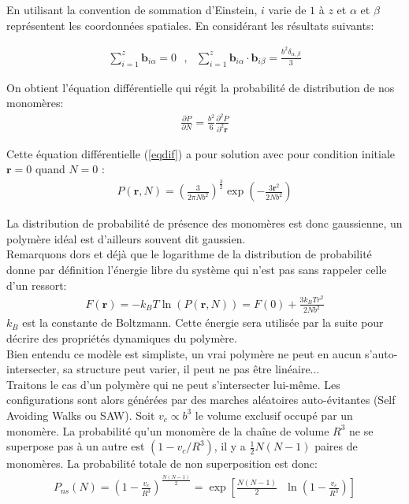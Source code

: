 \documentclass[a4paper,11pt]{article}
\begin{document}
En utilisant la convention de sommation d'Einstein, $i$ varie de $1$ à $z$ et $\alpha$ et $\beta$ représentent les coordonnées spatiales. En considérant les résultats suivants:

\begin{eqnarray}
\sum_{i=1}^{z}\textbf{b}_{i\alpha}=0 \text{ },\text{ } \sum_{i=1}^{z}\textbf{b}_{i\alpha}\cdot\textbf{b}_{i\beta} = \frac{b^2\delta_{\alpha,\beta}}{3}
\end{eqnarray}

On obtient l'équation différentielle qui régit la probabilité de distribution de nos monomères:
\begin{eqnarray}
 \frac{\partial P}{\partial N} =   \frac{b^2}{6}\frac{\partial ^2 P}{\partial ^2 \textbf{r}}
 \label{eqdif}
\end{eqnarray}

Cette équation différentielle (\ref{eqdif}) a pour solution avec pour condition initiale $\textbf{r}=0$ quand $N=0$ :
\begin{eqnarray}
P(\textbf{r},N)=\left(\frac{3}{2\pi N b^2}\right)^\frac{3}{2}\exp\left(-\frac{3\textbf{r}^2}{2 N b^2}\right)
\end{eqnarray}

La distribution de probabilité de présence des monomères est donc gaussienne, un polymère idéal est d'ailleurs souvent dit gaussien.\\

Remarquons dors et déjà que le logarithme de la distribution de probabilité donne par définition l'énergie libre du système qui n'est pas sans rappeler celle d'un ressort:
\begin{eqnarray}
F(\textbf{r})= - k_B T \ln(P(\textbf{r},N))= F(0)+\frac{3k_BTr^2}{2Nb^2}
\label{elibre}
\end{eqnarray}
$k_B$ est la constante de Boltzmann. Cette énergie sera utilisée par la suite pour décrire des propriétés dynamiques du polymère.\\



Bien entendu ce modèle est simpliste, un vrai polymère ne peut en aucun s'auto-intersecter, sa structure peut varier, il peut ne pas être linéaire...\\

 Traitons le cas d'un polymère qui ne peut s'intersecter lui-même. Les configurations sont alors générées par des marches aléatoires auto-évitantes (Self Avoiding Walks ou SAW). Soit $v_c \propto b^3$ le volume exclusif occupé par un monomère. La probabilité qu'un monomère de la chaîne de volume $R^3$ ne se superpose pas à un autre est $(1-v_c/R^3)$, il y a $\frac{1}{2}N(N-1)$ paires de monomères. La probabilité totale de non superposition est donc:
 \begin{eqnarray}
P_{ns}(N)= \left(1-\frac{v_c}{R^3}\right)^{\frac{N(N-1)}{2}} = \exp\left[\frac{N(N-1)}{2}\text{ }\ln\left(1-\frac{v_c}{R^3}\right)\right]
\end{eqnarray}
\end{document}
